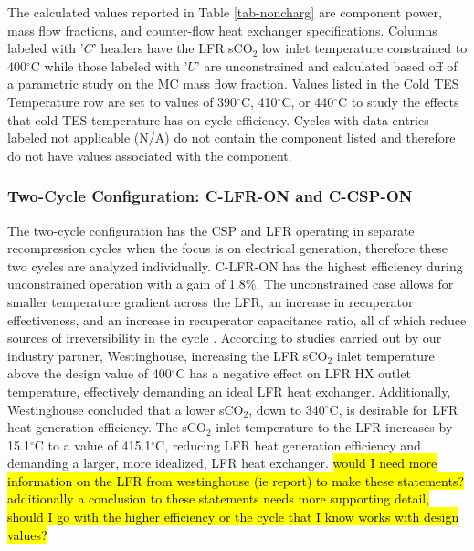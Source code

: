 \begin{paracol}{2}
\linenumbers
\switchcolumn

The calculated values reported in Table \ref{tab-noncharg} are component power, mass flow fractions, and counter-flow heat exchanger specifications. Columns labeled with '$C$' headers have the LFR sCO$_2$ low inlet temperature constrained to 400$^{\circ}$C while those labeled with '$U$' are unconstrained and calculated based off of a parametric study on the MC mass flow fraction. Values listed in the Cold TES Temperature row are set to values of 390$^{\circ}$C, 410$^{\circ}$C, or 440$^{\circ}$C to study the effects that cold TES temperature has on cycle efficiency. Cycles with data entries labeled not applicable (N/A) do not contain the component listed and therefore do not have values associated with the component. 

\subsubsection{Two-Cycle Configuration: C-LFR-ON and C-CSP-ON}

The two-cycle configuration has the CSP and LFR operating in separate recompression cycles when the focus is on electrical generation, therefore these two cycles are analyzed individually. C-LFR-ON has the highest efficiency during unconstrained operation with a gain of 1.8\%. The unconstrained case allows for smaller temperature gradient across the LFR, an increase in recuperator effectiveness, and an increase in recuperator capacitance ratio, all of which reduce sources of irreversibility in the cycle \cite{klein_nellis_2011}. According to studies carried out by our industry partner, Westinghouse, increasing the LFR sCO$_2$ inlet temperature above the design value of 400$^{\circ}$C has a negative effect on LFR HX outlet temperature, effectively demanding an ideal LFR heat exchanger. Additionally, Westinghouse concluded that a lower sCO$_2$, down to 340$^{\circ}$C, is desirable for LFR heat generation efficiency. The sCO$_2$ inlet temperature to the LFR increases by 15.1$^{\circ}$C to a value of 415.1$^{\circ}$C, reducing LFR heat generation efficiency and demanding a larger, more idealized, LFR heat exchanger.   
\hl{would I need more information on the LFR from westinghouse (ie report) to make these statements? additionally a conclusion to these statements needs more supporting detail, should I go with the higher efficiency or the cycle that I know works with design values?}


\end{paracol}
